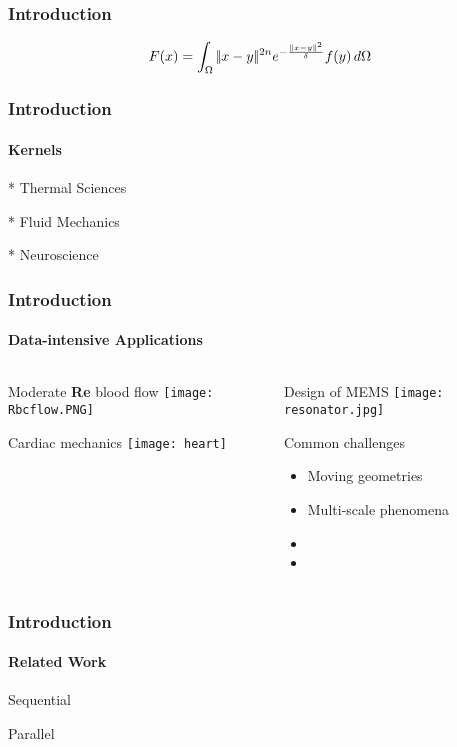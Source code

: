 \begin{frame}
\frametitle{Introduction }
\begin{block}{}
\[ 
F(x) = \int_\Omega |\!| x - y |\!|^{2n} e^{-\frac{|\!| x - y |\!|^2}{\delta}} f(y) \, d\Omega
 \] 
\end{block}

\end{frame}


\begin{frame}
\frametitle{Introduction }
\framesubtitle{Kernels}
\begin{block}{}

* Thermal Sciences 

* Fluid Mechanics

* Neuroscience


\end{block}

\end{frame}

\begin{frame}	
\frametitle{Introduction }
\framesubtitle{Data-intensive Applications}

\begin{columns}
\begin{column}{.5\textwidth}
 
            \begin{center} Moderate \textbf{Re} blood flow \texttt{[image: Rbcflow.PNG]} \end{center}

  	\begin{center} Cardiac mechanics \texttt{[image: heart]} \end{center}

\end{column}
\begin{column}{.5\textwidth}
    \begin{center}Design of MEMS \texttt{[image: resonator.jpg]} \end{center}
    
\begin{block}{Common challenges}
\begin{itemize}
 \item Moving geometries
 \item Multi-scale phenomena
 \item
 \item
\end{itemize}
\end{block}

\end{column}
\end{columns}
\end{frame}

\begin{frame}
\frametitle{Introduction }
\framesubtitle{Related Work}
\begin{block}{Sequential}

\end{block}

\begin{block}{Parallel}

\end{block}
\end{frame}

